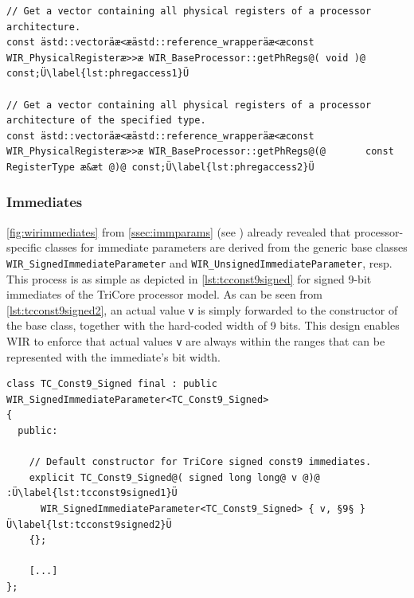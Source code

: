 \begin{lstlisting}[style=code,float=h,caption={Physical Register Access in Class \texttt{WIR\_BaseProcessor}},label=lst:phregaccess]
// Get a vector containing all physical registers of a processor architecture.
const ästd::vectoräæ<æästd::reference_wrapperäæ<æconst WIR_PhysicalRegisteræ>>æ WIR_BaseProcessor::getPhRegs@( void )@ const;Ü\label{lst:phregaccess1}Ü

// Get a vector containing all physical registers of a processor architecture of the specified type.
const ästd::vectoräæ<æästd::reference_wrapperäæ<æconst WIR_PhysicalRegisteræ>>æ WIR_BaseProcessor::getPhRegs@(@       const RegisterType æ&æt @)@ const;Ü\label{lst:phregaccess2}Ü
\end{lstlisting}


\subsubsection{Immediates}
\label{sssec:immediates}

\cref{fig:wirimmediates} from \cref{ssec:immparams} (see ) already revealed that processor-specific classes for immediate parameters are derived from the generic base classes \texttt{WIR\_SignedImmediateParameter} and \texttt{WIR\_UnsignedImmedi\-ateParameter}, resp.
This process is as simple as depicted in \cref{lst:tcconst9signed} for signed 9-bit immediates of the TriCore processor model.
As can be seen from \cref{lst:tcconst9signed2}, an actual value \texttt{v} is simply forwarded to the constructor of the base class, together with the hard-coded width of 9 bits.
This design enables \gls{WIR} to enforce that actual values \texttt{v} are always within the ranges that can be represented with the immediate's bit width.

\begin{lstlisting}[style=code,float=h,caption={Derivation of Processor-Specific Immediates (here for TriCore architecture)},label=lst:tcconst9signed]
class TC_Const9_Signed final : public WIR_SignedImmediateParameter<TC_Const9_Signed>
{
  public:

    // Default constructor for TriCore signed const9 immediates.
    explicit TC_Const9_Signed@( signed long long@ v @)@ :Ü\label{lst:tcconst9signed1}Ü
      WIR_SignedImmediateParameter<TC_Const9_Signed> { v, §9§ }Ü\label{lst:tcconst9signed2}Ü
    {};

    [...]
};
\end{lstlisting}

